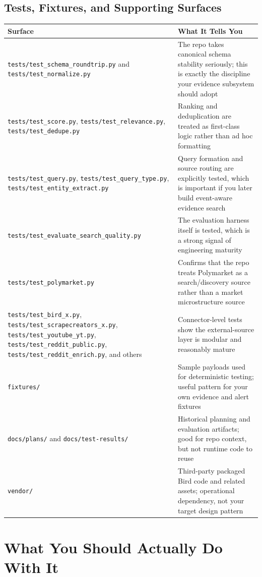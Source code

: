 \documentclass[11pt, letterpaper]{article}
\begin{document}
\subsection{Tests, Fixtures, and Supporting Surfaces}

\begin{longtable}{p{4.0cm}p{9.8cm}}
\toprule
\textbf{Surface} & \textbf{What It Tells You} \\
\midrule
\endhead
\texttt{tests/test\_schema\_roundtrip.py} and \texttt{tests/test\_normalize.py} & The repo takes canonical schema stability seriously; this is exactly the discipline your evidence subsystem should adopt \\
\texttt{tests/test\_score.py}, \texttt{tests/test\_relevance.py}, \texttt{tests/test\_dedupe.py} & Ranking and deduplication are treated as first-class logic rather than ad hoc formatting \\
\texttt{tests/test\_query.py}, \texttt{tests/test\_query\_type.py}, \texttt{tests/test\_entity\_extract.py} & Query formation and source routing are explicitly tested, which is important if you later build event-aware evidence search \\
\texttt{tests/test\_evaluate\_search\_quality.py} & The evaluation harness itself is tested, which is a strong signal of engineering maturity \\
\texttt{tests/test\_polymarket.py} & Confirms that the repo treats Polymarket as a search/discovery source rather than a market microstructure source \\
\texttt{tests/test\_bird\_x.py}, \texttt{tests/test\_scrapecreators\_x.py}, \texttt{tests/test\_youtube\_yt.py}, \texttt{tests/test\_reddit\_public.py}, \texttt{tests/test\_reddit\_enrich.py}, and others & Connector-level tests show the external-source layer is modular and reasonably mature \\
\texttt{fixtures/} & Sample payloads used for deterministic testing; useful pattern for your own evidence and alert fixtures \\
\texttt{docs/plans/} and \texttt{docs/test-results/} & Historical planning and evaluation artifacts; good for repo context, but not runtime code to reuse \\
\texttt{vendor/} & Third-party packaged Bird code and related assets; operational dependency, not your target design pattern \\
\bottomrule
\end{longtable}

\section{What You Should Actually Do With It}
\end{document}
